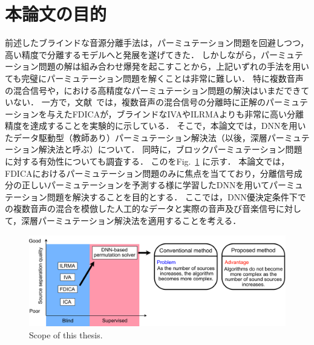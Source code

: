 \section{本論文の目的}
前述したブラインドな音源分離手法は，パーミュテーション問題を回避しつつ，高い精度で分離するモデルへと発展を遂げてきた．
しかしながら，パーミュテーション問題の解は組み合わせ爆発を起こすことから，上記いずれの手法を用いても完璧にパーミュテーション問題を解くことは非常に難しい．
特に複数音声の混合信号や，における高精度なパーミュテーション問題の解決はいまだできていない．
一方で，文献~\cite{EU}では，複数音声の混合信号の分離時に正解のパーミュテーションを与えたFDICAが，ブラインドなIVAやILRMAよりも非常に高い分離精度を達成することを実験的に示している．
そこで，本論文では，DNNを用いたデータ駆動型（教師あり）パーミュテーション解決法（以後，深層パーミュテーション解決法と呼ぶ）について．
同時に，ブロックパーミュテーション問題に対する有効性についても調査する．
このをFig.~\ref{fig:scope} に示す．
本論文では，FDICAにおけるパーミュテーション問題のみに焦点を当てており，分離信号成分の正しいパーミュテーションを予測する様に学習したDNNを用いてパーミュテーション問題を解決することを目的とする．
ここでは，DNN優決定条件下での複数音声の混合を模倣した人工的なデータと実際の音声及び音楽信号に対して，深層パーミュテーション解決法を適用することを考える．

\begin{figure}[t]
    \vspace{4pt}
    \begin{center}
        \includegraphics[width=1.0\columnwidth]{figures/chapter1/scope.pdf}
    \end{center}
    \vspace{-8pt}
	\caption{Scope of this thesis.}
	\label{fig:scope}
\end{figure}



